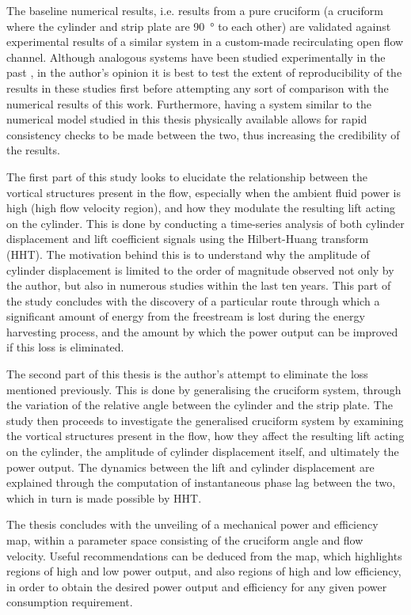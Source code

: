 \documentclass[oneside]{utmthesis}
\begin{document}
The baseline numerical results, i.e. results from a pure cruciform (a cruciform where the cylinder and strip plate are \SI{90}{\degree} to each other) are validated against experimental results of a similar system in a custom-made recirculating open flow channel. Although analogous systems have been studied experimentally in the past \citep{Koide2017,Zhao2018a}, in the author's opinion it is best to test the extent of reproducibility of the results in these studies first before attempting any sort of comparison with the numerical results of this work. Furthermore, having a system similar to the numerical model studied in this thesis physically available allows for rapid consistency checks to be made between the two, thus increasing the credibility of the results.

The first part of this study looks to elucidate the relationship between the vortical structures present in the flow, especially when the ambient fluid power is high (high flow velocity region), and how they modulate the resulting lift acting on the cylinder. This is done by conducting a time-series analysis of both cylinder displacement and lift coefficient signals using the Hilbert-Huang transform (HHT). The motivation behind this is to understand why the amplitude of cylinder displacement is limited to the order of magnitude observed not only by the author, but also in numerous studies within the last ten years. This part of the study concludes with the discovery of a particular route through which a significant amount of energy from the freestream is lost during the energy harvesting process, and the amount by which the power output can be improved if this loss is eliminated.

The second part of this thesis is the author's attempt to eliminate the loss mentioned previously. This is done by generalising the cruciform system, through the variation of the relative angle between the cylinder and the strip plate. The study then proceeds to investigate the generalised cruciform system by examining the vortical structures present in the flow, how they affect the resulting lift acting on the cylinder, the amplitude of cylinder displacement itself, and ultimately the power output. The dynamics between the lift and cylinder displacement are explained through the computation of instantaneous phase lag between the two, which in turn is made possible by HHT.

The thesis concludes with the unveiling of a mechanical power and efficiency map, within a parameter space consisting of the cruciform angle and flow velocity. Useful recommendations can be deduced from the map, which highlights regions of high and low power output, and also regions of high and low efficiency, in order to obtain the desired power output and efficiency for any given power consumption requirement.
\end{document}
